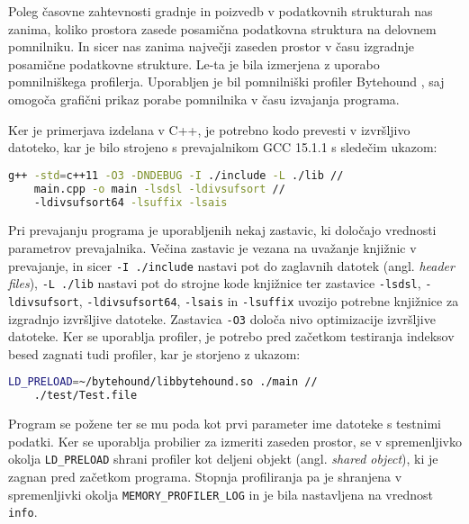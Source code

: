 Poleg časovne zahtevnosti gradnje in poizvedb v podatkovnih strukturah nas zanima, koliko prostora zasede posamična podatkovna struktura na delovnem pomnilniku. In sicer nas zanima največji zaseden prostor v času izgradnje posamične podatkovne strukture. Le-ta je bila izmerjena z uporabo pomnilniškega profilerja. Uporabljen je bil pomnilniški profiler Bytehound \cite{Bytehound2024}, saj omogoča grafični prikaz porabe pomnilnika v času izvajanja programa.

Ker je primerjava izdelana v C++, je potrebno kodo prevesti v izvršljivo datoteko, kar je bilo strojeno s prevajalnikom GCC 15.1.1 s sledečim ukazom:
\begin{lstlisting}[language=bash]
    g++ -std=c++11 -O3 -DNDEBUG -I ./include -L ./lib // 
    main.cpp -o main -lsdsl -ldivsufsort //
    -ldivsufsort64 -lsuffix -lsais
\end{lstlisting}
Pri prevajanju programa je uporabljenih nekaj zastavic, ki določajo vrednosti parametrov prevajalnika. Večina zastavic je vezana na uvažanje knjižnic v prevajanje, in sicer \verb|-I ./include| nastavi pot do zaglavnih datotek (angl. \textit{header files}), \verb|-L ./lib| nastavi pot do strojne kode knjižnice ter zastavice \verb|-lsdsl|, \verb|-ldivsufsort|, \verb|-ldivsufsort64|,  \verb|-lsais| in \verb|-lsuffix| uvozijo potrebne knjižnice za izgradnjo izvršljive datoteke.
Zastavica \verb|-O3| določa nivo optimizacije izvršljive datoteke. Ker se uporablja profiler, je potrebo pred začetkom testiranja indeksov besed zagnati tudi profiler, kar je storjeno z ukazom:
\begin{lstlisting}[language=bash]
    LD_PRELOAD=~/bytehound/libbytehound.so ./main // 
    ./test/Test.file 
\end{lstlisting}
Program se požene ter se mu poda kot prvi parameter ime datoteke s testnimi podatki. Ker se uporablja probilier za izmeriti zaseden prostor, se v spremenljivko okolja \verb|LD_PRELOAD| shrani profiler kot deljeni objekt (angl. \textit{shared object}), ki je zagnan pred začetkom programa. Stopnja profiliranja pa je shranjena v spremenljivki okolja \verb|MEMORY_PROFILER_LOG| in je bila nastavljena na vrednost \verb|info|.





